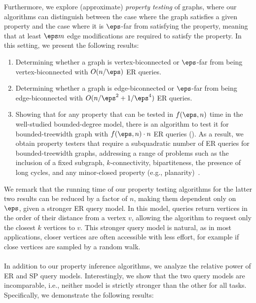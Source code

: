 Furthermore, we explore (approximate) \emph{property testing} of graphs, where our algorithms can distinguish between the case where the graph satisfies a given property and the case where it is $\eps$-far from satisfying the property, meaning that at least $\eps m$ edge modifications are required to satisfy the property. In this setting, we present the following results:

\begin{enumerate}[(1)]
    \item Determining whether a graph is vertex-biconnected or $\eps$-far from being vertex-biconnected with $O(n/\eps)$ ER queries.
    \item Determining whether a graph is edge-biconnected or $\eps$-far from being edge-biconnected with $O(n/\eps^2 + 1/\eps^4)$ ER queries.
    \item Showing that for any property that can be tested in $f(\eps, n)$ time in the well-studied bounded-degree model, there is an algorithm to test it for bounded-treewidth graph with $f(\eps, n) \cdot n$ ER queries (). 
    As a result, we obtain property testers that require a subquadratic number of ER queries for bounded-treewidth graphs, addressing a range of problems such as the inclusion of a fixed subgraph, $k$-connectivity, bipartiteness, the presence of long cycles, and any minor-closed property (e.g., planarity)~\cite{books/cu/Goldreich17}.

\end{enumerate}

We remark that the running time of our property testing algorithms for the latter two results can be reduced by a factor of $n$, making them dependent only on $\eps$, given a stronger ER query model. In this model, queries return vertices in the order of their distance from a vertex $v$, allowing the algorithm to request only the closest $k$ vertices to $v$. This stronger query model is natural, as in most applications, closer vertices are often accessible with less effort, for example if close vertices are sampled by a random walk.
\\ \\
In addition to our property inference algorithms, we analyze the relative power of ER and SP query models. Interestingly, we show that the two query models are incomparable, i.e., neither model is strictly stronger than the other for all tasks. Specifically, we demonstrate the following results:

